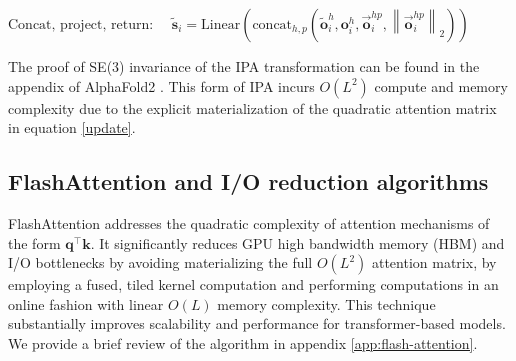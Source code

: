 \documentclass{article}
\begin{document}
\begin{equation}
\text{Concat, project, return: } \quad 
\mathbf{\tilde{s}}_i = \textrm{Linear}\left(\textrm{concat}_{h,p}\left(\tilde{\mathbf{o}}_i^h, \mathbf{o}_i^h, \vec{\mathbf{o}}_i^{hp}, \left\|\vec{\mathbf{o}}_i^{hp}\right\|_2\right)\right) \qquad \qquad \quad \qquad \quad \qquad \qquad \qquad \qquad   
\end{equation}

The proof of SE(3) invariance of the IPA transformation can be found in the appendix of AlphaFold2 \cite{jumper2021highly}.
This form of IPA incurs $O(L^2)$ compute and memory complexity due to the explicit materialization of the quadratic attention matrix in equation \ref{update}.

\subsection{FlashAttention and I/O reduction algorithms}
FlashAttention \cite{dao2022flashattention,dao2024flashattention2} addresses the quadratic complexity of attention mechanisms of the form $\mathbf{q^\intercal} \mathbf{k}$. It significantly reduces GPU high bandwidth memory (HBM) and I/O bottlenecks by avoiding materializing the full $O(L^2)$ attention matrix, by employing a fused, tiled kernel computation and performing computations in an online fashion with linear $O(L)$ memory complexity. This technique substantially improves scalability and performance for transformer-based models. We provide a brief review of the algorithm in appendix \ref{app:flash-attention}.
\end{document}
